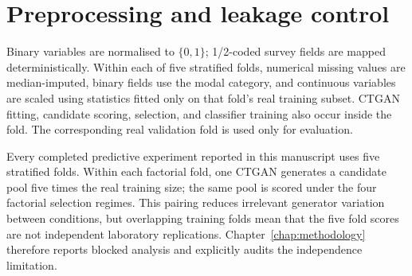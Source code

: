 \section{Preprocessing and leakage control}

Binary variables are normalised to $\{0,1\}$; 1/2-coded survey fields are mapped deterministically. Within each of five stratified folds, numerical missing values are median-imputed, binary fields use the modal category, and continuous variables are scaled using statistics fitted only on that fold's real training subset. CTGAN fitting, candidate scoring, selection, and classifier training also occur inside the fold. The corresponding real validation fold is used only for evaluation.

Every completed predictive experiment reported in this manuscript uses five stratified folds. Within each factorial fold, one CTGAN generates a candidate pool five times the real training size; the same pool is scored under the four factorial selection regimes. This pairing reduces irrelevant generator variation between conditions, but overlapping training folds mean that the five fold scores are not independent laboratory replications. Chapter~\ref{chap:methodology} therefore reports blocked analysis and explicitly audits the independence limitation.
